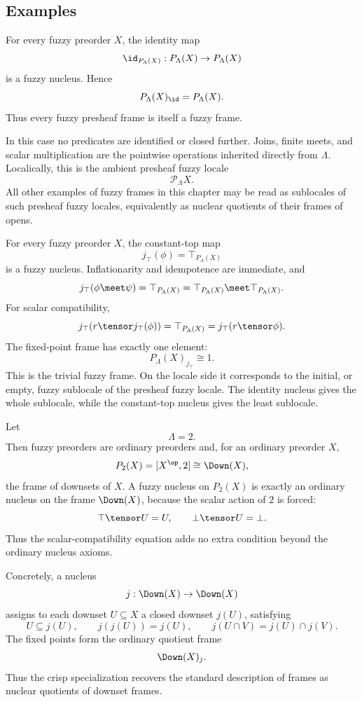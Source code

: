 \subsection{Examples}
\label{subsec:localizing-presheaves-examples}

\begin{example}
\label{ex:identity-localization}
For every fuzzy preorder \(X\), the identity map
\[
    \id_{P_\Lambda(X)}:
    P_\Lambda(X)\to P_\Lambda(X)
\]
is a fuzzy nucleus. Hence
\[
    P_\Lambda(X)_{\id}
    =
    P_\Lambda(X).
\]
Thus every fuzzy presheaf frame is itself a fuzzy frame.

In this case no predicates are identified or closed further. Joins, finite meets, and
scalar multiplication are the pointwise operations inherited directly from
\(\Lambda\). Localically, this is the ambient presheaf fuzzy locale
\[
    \mathcal P_\Lambda X.
\]
All other examples of fuzzy frames in this chapter may be read as sublocales of such
presheaf fuzzy locales, equivalently as nuclear quotients of their frames of opens.
\end{example}

\begin{example}
\label{ex:terminal-localization}
For every fuzzy preorder \(X\), the constant-top map
\[
    j_\top(\phi)=\top_{P_\Lambda(X)}
\]
is a fuzzy nucleus. Inflationarity and idempotence are immediate, and
\[
    j_\top(\phi\meet\psi)=\top_{P_\Lambda(X)}
    =
    \top_{P_\Lambda(X)}\meet\top_{P_\Lambda(X)}.
\]
For scalar compatibility,
\[
    j_\top(r\tensor j_\top(\phi))
    =
    \top_{P_\Lambda(X)}
    =
    j_\top(r\tensor\phi).
\]
The fixed-point frame has exactly one element:
\[
    P_\Lambda(X)_{j_\top}\cong 1.
\]
This is the trivial fuzzy frame. On the locale side it corresponds to the initial, or
empty, fuzzy sublocale of the presheaf fuzzy locale. The identity nucleus gives the
whole sublocale, while the constant-top nucleus gives the least sublocale.
\end{example}

\begin{example}
\label{ex:crisp-localization-case}
Let
\[
    \Lambda=2.
\]
Then fuzzy preorders are ordinary preorders and, for an ordinary preorder \(X\),
\[
    P_2(X)
    =
    [X^{\op},2]
    \cong
    \Down(X),
\]
the frame of downsets of \(X\). A fuzzy nucleus on \(P_2(X)\) is exactly an ordinary
nucleus on the frame \(\Down(X)\), because the scalar action of \(2\) is forced:
\[
    \top\tensor U=U,
    \qquad
    \bot\tensor U=\bot.
\]
Thus the scalar-compatibility equation adds no extra condition beyond the ordinary
nucleus axioms.

Concretely, a nucleus
\[
    j:\Down(X)\to\Down(X)
\]
assigns to each downset \(U\subseteq X\) a closed downset \(j(U)\), satisfying
\[
    U\subseteq j(U),
    \qquad
    j(j(U))=j(U),
    \qquad
    j(U\cap V)=j(U)\cap j(V).
\]
The fixed points form the ordinary quotient frame
\[
    \Down(X)_j.
\]
Thus the crisp specialization recovers the standard description of frames as
nuclear quotients of downset frames.
\end{example}

